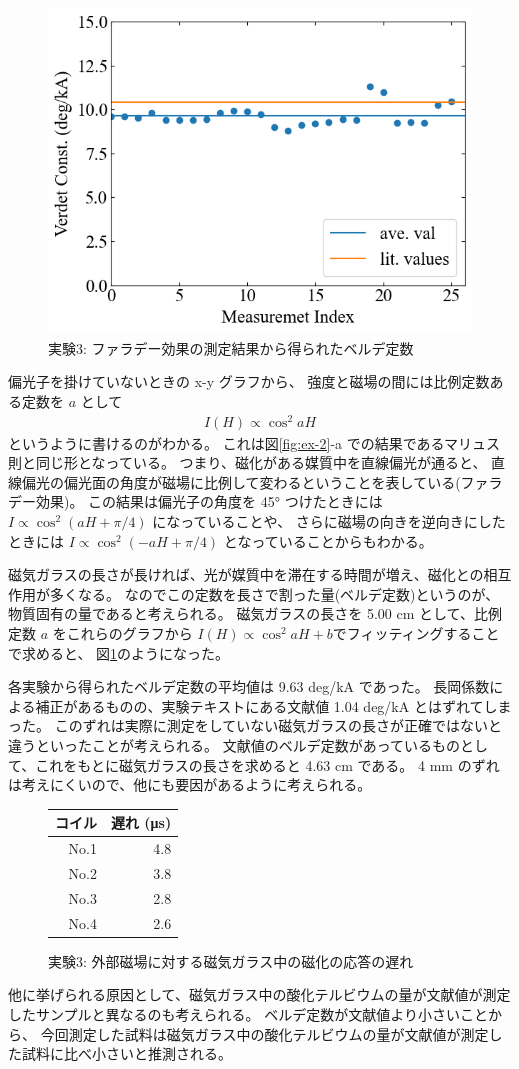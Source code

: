 \documentclass[9pt,dvipdfmx,a4paper]{jsarticle}
\begin{document}
\begin{figure}
    \centering
    \includegraphics[width=0.48\columnwidth]{verdet.png}
    \caption{実験3: ファラデー効果の測定結果から得られたベルデ定数}
    \label{graph:ex-3-1}
\end{figure}
偏光子を掛けていないときの x-y グラフから、
強度と磁場の間には比例定数ある定数を \(a\) として
\begin{align}
    I(H) \propto \cos^2 aH
\end{align}
というように書けるのがわかる。
これは図\ref{fig:ex-2}-a での結果であるマリュス則と同じ形となっている。
つまり、磁化がある媒質中を直線偏光が通ると、
直線偏光の偏光面の角度が磁場に比例して変わるということを表している(ファラデー効果)。
この結果は偏光子の角度を \ang{45} つけたときには \(I \propto \cos^2(aH+\pi/4)\) になっていることや、
さらに磁場の向きを逆向きにしたときには \(I \propto \cos^2(-aH+\pi/4)\) となっていることからもわかる。

磁気ガラスの長さが長ければ、光が媒質中を滞在する時間が増え、磁化との相互作用が多くなる。
なのでこの定数を長さで割った量(ベルデ定数)というのが、物質固有の量であると考えられる。
磁気ガラスの長さを 5.00 cm として、比例定数 \(a\) をこれらのグラフから \(I(H) \propto \cos^2 aH+b\)でフィッティングすることで求めると、
図\ref{graph:ex-3-1}のようになった。

各実験から得られたベルデ定数の平均値は 9.63 deg/kA であった。
長岡係数による補正があるものの、実験テキストにある文献値 1.04 deg/kA とはずれてしまった。
このずれは実際に測定をしていない磁気ガラスの長さが正確ではないと違うといったことが考えられる。
文献値のベルデ定数があっているものとして、これをもとに磁気ガラスの長さを求めると 4.63 cm である。
4 mm のずれは考えにくいので、他にも要因があるように考えられる。

\begin{figure}
    \centering
    \caption{実験3: 外部磁場に対する磁気ガラス中の磁化の応答の遅れ}
    \label{table:ex-3-1}
    \begin{tabular}{rr}
        \hline
        コイル & 遅れ (\si{\micro s})\\
        \hline
        No.1 & 4.8\\
        No.2 & 3.8\\
        No.3 & 2.8\\
        No.4 & 2.6\\
        \hline
    \end{tabular}
\end{figure}
他に挙げられる原因として、磁気ガラス中の酸化テルビウムの量が文献値が測定したサンプルと異なるのも考えられる。
ベルデ定数が文献値より小さいことから、
今回測定した試料は磁気ガラス中の酸化テルビウムの量が文献値が測定した試料に比べ小さいと推測される。
\end{document}
